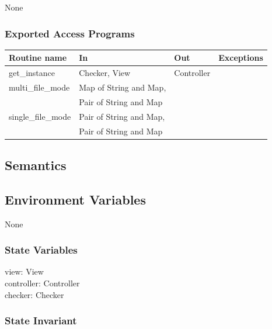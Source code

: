 \documentclass[12pt]{article}
\begin{document}
None

\subsubsection* {Exported Access Programs}

\begin{tabular}{| l | l | l | p{4.7cm} |}
\hline
\textbf{Routine name} & \textbf{In} & \textbf{Out} & \textbf{Exceptions}\\
\hline
get\_instance & Checker, View & Controller & \\
\hline
multi\_file\_mode & Map of String and Map, & &\\
                  & Pair of String and Map & & \\
\hline
single\_file\_mode & Pair of String and Map, & &\\
                   & Pair of String and Map & & \\
\hline
\end{tabular}

\subsection* {Semantics}

\subsection*{Environment Variables}

None

\subsubsection* {State Variables}

view: View \\
controller: Controller\\
checker: Checker

\subsubsection* {State Invariant}
\end{document}

